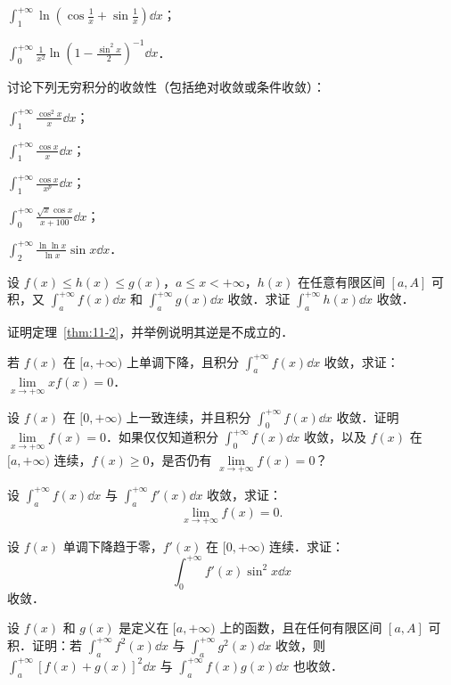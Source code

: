 \begin{xiti}
\begin{ziti}
\item $\displaystyle\int_{1}^{+\infty}\ln\left(\cos\frac{1}{x}+\sin\frac{1}{x}\right)\dd x$；
\item $\displaystyle\int_{0}^{+\infty}\frac{1}{x^{2}}\ln\left(1-\frac{\sin^{2}x}{2}\right)^{-1}\dd x$．
\end{ziti}
\item 讨论下列无穷积分的收敛性（包括绝对收敛或条件收敛）：
\begin{ziti}
\item $\displaystyle\int_{1}^{+\infty}\frac{\cos^{2}x}{x}\dd x$；
\item $\displaystyle\int_{1}^{+\infty}\frac{\cos x}{x}\dd x$；
\item $\displaystyle\int_{1}^{+\infty}\frac{\cos x}{x^{p}}\dd x$；
\item $\displaystyle\int_{0}^{+\infty}\frac{\sqrt{x}\cos x}{x+100}\dd x$；
\item $\displaystyle\int_{2}^{+\infty}\frac{\ln\ln x}{\ln x}\sin x\dd x$．
\end{ziti}
\item 设 $f(x)\leqslant h(x)\leqslant g(x)$，$a\leqslant x<+\infty$，$h(x)$ 在任意有限区间 $[a,A]$ 可积，又 $\displaystyle\int_{a}^{+\infty}f(x)\dd x$ 和 $\displaystyle\int_{a}^{+\infty}g(x)\dd x$ 收敛．求证 $\displaystyle\int_{a}^{+\infty}h(x)\dd x$ 收敛．
\item 证明定理~\ref{thm:11-2}，并举例说明其逆是不成立的．
\item 若 $f(x)$ 在 $[a,+\infty)$ 上单调下降，且积分 $\displaystyle\int_{a}^{+\infty}f(x)\dd x$ 收敛，求证：$\lim\limits_{x\to+\infty}xf(x)=0$．
\item 设 $f(x)$ 在 $[0,+\infty)$ 上一致连续，并且积分 $\displaystyle\int_{0}^{+\infty}f(x)\dd x$ 收敛．证明 $\lim\limits_{x\to+\infty}f(x)=0$．如果仅仅知道积分 $\displaystyle\int_{0}^{+\infty}f(x)\dd x$ 收敛，以及 $f(x)$ 在 $[a,+\infty)$ 连续，$f(x)\geqslant 0$，是否仍有 $\lim\limits_{x\to+\infty}f(x)=0$？
\item 设 $\displaystyle\int_{a}^{+\infty}f(x)\dd x$ 与 $\displaystyle\int_{a}^{+\infty}f'(x)\dd x$ 收敛，求证：
\[
\lim_{x\to+\infty}f(x)=0.
\]
\item 设 $f(x)$ 单调下降趋于零，$f'(x)$ 在 $[0,+\infty)$ 连续．求证：
\[
\int_{0}^{+\infty}f'(x)\sin^{2}x\dd x
\]
收敛．
\item 设 $f(x)$ 和 $g(x)$ 是定义在 $[a,+\infty)$ 上的函数，且在任何有限区间 $[a,A]$ 可积．证明：若 $\displaystyle\int_{a}^{+\infty}f^{2}(x)\dd x$ 与 $\displaystyle\int_{a}^{+\infty}g^{2}(x)\dd x$ 收敛，则 $\displaystyle\int_{a}^{+\infty}\left[f(x)+g(x)\right]^{2}\dd x$ 与 $\displaystyle\int_{a}^{+\infty}f(x)g(x)\dd x$ 也收敛．

\end{xiti}
